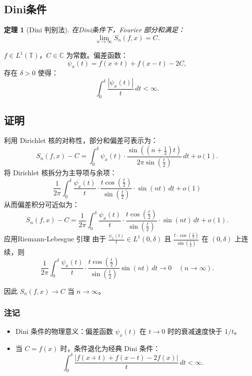 \documentclass[12pt]{article}
\newtheorem{theorem}{定理}  %
\begin{document}
	\subsection{Dini条件}
	
		\begin{theorem}[Dini 判别法]
		在Dini条件下，Fourier 部分和满足：
		\[
		\lim_{n \to \infty} S_n(f, x) = C.
		\]
	\end{theorem}
 $f \in L^1(\mathbb{T})$，$C \in \mathbb{C}$ 为常数。偏差函数：
	\[
	\psi_x(t) = f(x+t) + f(x-t) - 2C,
	\]
	存在 $\delta > 0$ 使得：
	\[
	\int_0^\delta \frac{|\psi_x(t)|}{t} \, dt < \infty.
	\]


	
	\subsection{证明}
利用 Dirichlet 核的对称性，部分和偏差可表示为：
		\[
		S_n(f, x) - C = \int_0^\delta \psi_x(t) \cdot \frac{\sin\left( (n+\frac{1}{2})t \right)}{2\pi \sin\left( \frac{t}{2} \right)} \, dt + o(1).
		\]		
将 Dirichlet 核拆分为主导项与余项：
	\[
 \frac{1}{2\pi} \int_0^\delta \frac{\psi_x(t)}{t} \cdot \frac{t \cos\left( \frac{t}{2} \right)}{\sin\left( \frac{t}{2} \right)} \cdot \sin(nt) \, dt+ o(1)
	\]
		从而偏差积分可近似为：
		\[
		S_n(f, x) - C =  \frac{1}{2\pi} \int_0^\delta \frac{\psi_x(t)}{t} \cdot \frac{t \cos\left( \frac{t}{2} \right)}{\sin\left( \frac{t}{2} \right)} \cdot \sin(nt) \, dt+ o(1).
		\]
应用Riemann-Lebesgue 引理
由于 $\frac{\psi_x(t)}{t} \in L^1(0, \delta)$ 且 $\frac{t \cdot \cos\left( \frac{t}{2} \right)}{\sin\left( \frac{t}{2} \right)}$ 在 $(0,\delta)$ 上连续，则
	\[
	\frac{1}{2\pi} \int_0^\delta \frac{\psi_x(t)}{t} \cdot \frac{t \cos\left( \frac{t}{2} \right)}{\sin\left( \frac{t}{2} \right)} \sin(nt) \, dt \to 0 \quad (n \to \infty).
	\]
		
		因此 $S_n(f, x) \to C$ 当 $n \to \infty$。

	
	\subsubsection{注记}
	\begin{itemize}
		\item Dini 条件的物理意义：偏差函数 $\psi_x(t)$ 在 $t \to 0$ 时的衰减速度快于 $1/t$。
		\item 当 $C = f(x)$ 时，条件退化为经典 Dini 条件：
		\[
		\int_0^\delta \frac{|f(x+t) + f(x-t) - 2f(x)|}{t} \, dt < \infty.
		\]
	\end{itemize}
	
\end{document}
